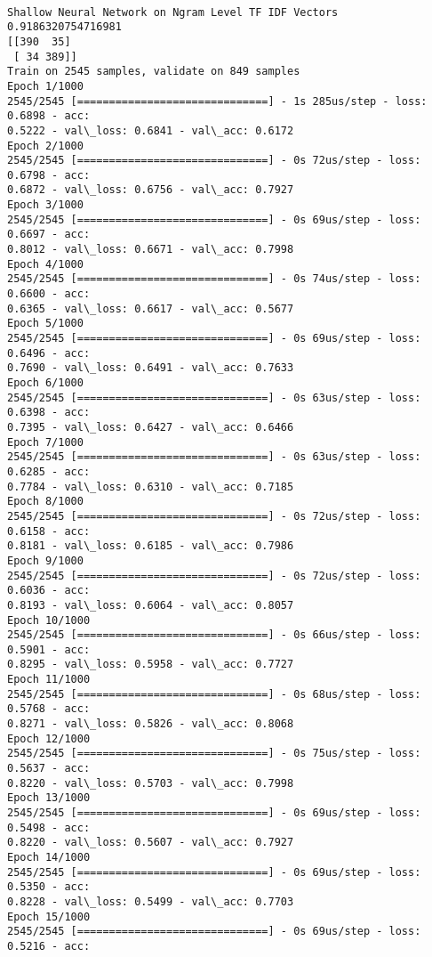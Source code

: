 \documentclass[11pt]{article}
\begin{document}
    \begin{center}
    \end{center}
    { \hspace*{\fill} \\}
    
    \begin{Verbatim}[commandchars=\\\{\}]
Shallow Neural Network on Ngram Level TF IDF Vectors 0.9186320754716981
[[390  35]
 [ 34 389]]
Train on 2545 samples, validate on 849 samples
Epoch 1/1000
2545/2545 [==============================] - 1s 285us/step - loss: 0.6898 - acc:
0.5222 - val\_loss: 0.6841 - val\_acc: 0.6172
Epoch 2/1000
2545/2545 [==============================] - 0s 72us/step - loss: 0.6798 - acc:
0.6872 - val\_loss: 0.6756 - val\_acc: 0.7927
Epoch 3/1000
2545/2545 [==============================] - 0s 69us/step - loss: 0.6697 - acc:
0.8012 - val\_loss: 0.6671 - val\_acc: 0.7998
Epoch 4/1000
2545/2545 [==============================] - 0s 74us/step - loss: 0.6600 - acc:
0.6365 - val\_loss: 0.6617 - val\_acc: 0.5677
Epoch 5/1000
2545/2545 [==============================] - 0s 69us/step - loss: 0.6496 - acc:
0.7690 - val\_loss: 0.6491 - val\_acc: 0.7633
Epoch 6/1000
2545/2545 [==============================] - 0s 63us/step - loss: 0.6398 - acc:
0.7395 - val\_loss: 0.6427 - val\_acc: 0.6466
Epoch 7/1000
2545/2545 [==============================] - 0s 63us/step - loss: 0.6285 - acc:
0.7784 - val\_loss: 0.6310 - val\_acc: 0.7185
Epoch 8/1000
2545/2545 [==============================] - 0s 72us/step - loss: 0.6158 - acc:
0.8181 - val\_loss: 0.6185 - val\_acc: 0.7986
Epoch 9/1000
2545/2545 [==============================] - 0s 72us/step - loss: 0.6036 - acc:
0.8193 - val\_loss: 0.6064 - val\_acc: 0.8057
Epoch 10/1000
2545/2545 [==============================] - 0s 66us/step - loss: 0.5901 - acc:
0.8295 - val\_loss: 0.5958 - val\_acc: 0.7727
Epoch 11/1000
2545/2545 [==============================] - 0s 68us/step - loss: 0.5768 - acc:
0.8271 - val\_loss: 0.5826 - val\_acc: 0.8068
Epoch 12/1000
2545/2545 [==============================] - 0s 75us/step - loss: 0.5637 - acc:
0.8220 - val\_loss: 0.5703 - val\_acc: 0.7998
Epoch 13/1000
2545/2545 [==============================] - 0s 69us/step - loss: 0.5498 - acc:
0.8220 - val\_loss: 0.5607 - val\_acc: 0.7927
Epoch 14/1000
2545/2545 [==============================] - 0s 69us/step - loss: 0.5350 - acc:
0.8228 - val\_loss: 0.5499 - val\_acc: 0.7703
Epoch 15/1000
2545/2545 [==============================] - 0s 69us/step - loss: 0.5216 - acc:

\end{Verbatim}
\end{document}
